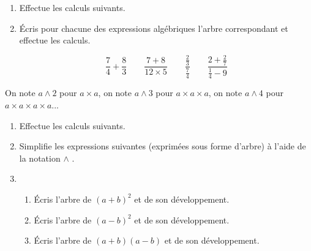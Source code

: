 \documentclass[class=report,crop=false, 12pt]{standalone}
\begin{document}
\begin{activite}%
\sauteligne
\begin{enumerate}
  \item Effectue les calculs suivants.

  
  \item Écris pour chacune des expressions algébriques l'arbre correspondant et effectue les calculs.
  
  $$
  \frac 74 + \frac 83
  \qquad
  \frac{7 + 8}{12 \times 5}
  \qquad
  \frac{ \frac 23 }{ \frac 74 }
  \qquad
  \frac{ 2 + \frac 27 }{ \frac 14 - 9 }
  $$

\end{enumerate}
\end{activite}


\begin{activite}%

On note $a \wedge 2$ pour $a \times a$, on note $a \wedge 3$ pour $a \times a \times a$, 
on note $a \wedge 4$ pour $a \times a \times a \times a$...

\begin{enumerate}
  \item Effectue les calculs suivants.
  
  
  \item  Simplifie les expressions suivantes (exprimées sous forme d'arbre) à l'aide de la notation \og $\wedge$ \fg{}.


  \item 
  \begin{enumerate}
    \item Écris l'arbre de $(a+b)^2$ et de son développement.
    \item Écris l'arbre de $(a-b)^2$ et de son développement.
    \item Écris l'arbre de $(a+b)(a-b)$ et de son développement.
  \end{enumerate}  
\end{enumerate}
\end{activite}
\end{document}
